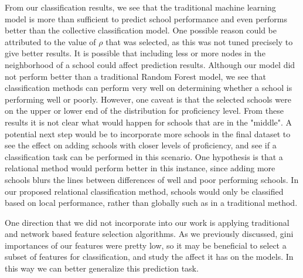 From our classification results, we see that the traditional machine learning model is more than sufficient to predict school performance and even performs better than the collective classification model. One possible reason could be attributed to the value of $\rho$ that was selected, as this was not tuned precisely to give better results. It is possible that including less or more nodes in the neighborhood of a school could affect prediction results. Although our model did not perform better than a traditional Random Forest model, we see that classification methods can perform very well on determining whether a school is performing well or poorly. However, one caveat is that the selected schools were on the upper or lower end of the distribution for proficiency level. From these results it is not clear what would happen for schools that are in the "middle". A potential next step would be to incorporate more schools in the final dataset to see the effect on adding schools with closer levels of proficiency, and see if a classification task can be performed in this scenario. One hypothesis is that a relational method would perform better in this instance, since adding more schools blurs the lines between differences of well and poor performing schools. In our proposed relational classification method, schools would only be classified based on local performance, rather than globally such as in a traditional method.

One direction that we did not incorporate into our work is applying traditional and network based feature selection algorithms. As we previously discussed, gini importances of our features were pretty low, so it may be beneficial to select a subset of features for classification, and study the affect it has on the models. In this way we can better generalize this prediction task.

